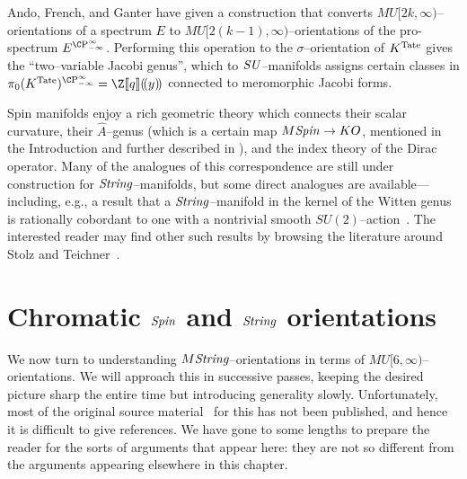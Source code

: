 \begin{remark}
Ando, French, and Ganter have given a construction that converts \(MU[2k, \infty)\)--orientations of a spectrum \(E\) to \(MU[2(k-1), \infty)\)--orientations of the pro-spectrum \(E^{\CP^\infty_{-\infty}}\).
Performing this operation to the \(\sigma\)--orientation of \(K^{\mathrm{Tate}}\) gives the ``two--variable Jacobi genus'', which to \(\mathit{SU}\)--manifolds assigns certain classes in \(\pi_0 (K^{\Tate})^{\CP^\infty_{-\infty}} = \Z\ps{q}(\!(y)\!)\) connected to meromorphic Jacobi forms.
\end{remark}

\begin{remark}
Spin manifolds enjoy a rich geometric theory which connects their scalar curvature, their $\widehat A$--genus (which is a certain map $M\mathit{Spin} \to KO$, mentioned in the Introduction and further described in ), and the index theory of the Dirac operator.
Many of the analogues of this correspondence are still under construction for $\mathit{String}$--manifolds, but some direct analogues are available---including, e.g., a result that a $\mathit{String}$--manifold in the kernel of the Witten genus is rationally cobordant to one with a nontrivial smooth $SU(2)$--action~\cite[Theorem 2.8]{Dessai}.
The interested reader may find other such results by browsing the literature around Stolz and Teichner~\cite{StolzTeichnerWhatIs}.
\end{remark}













\section{Chromatic \texorpdfstring{\(\mathit{Spin}\)}{Spin} and \texorpdfstring{\(\mathit{String}\)}{String} orientations}

We now turn to understanding \(M\mathit{String}\)--orientations in terms of \(MU[6, \infty)\)--orientations.
We will approach this in successive passes, keeping the desired picture sharp the entire time but introducing generality slowly.
Unfortunately, most of the original source material~\cite{HAS,StricklandFSKS} for this has not been published, and hence it is difficult to give references.
We have gone to some lengths to prepare the reader for the sorts of arguments that appear here: they are not so different from the arguments appearing elsewhere in this chapter.

